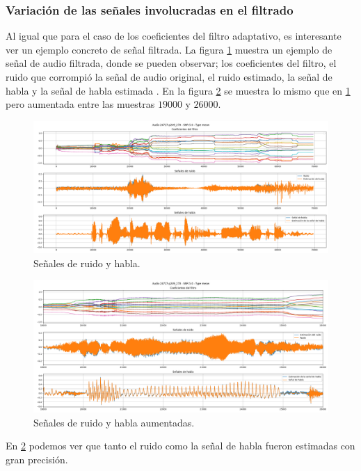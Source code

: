 \subsubsection{Variación de las señales involucradas en el filtrado}

Al igual que para el caso de los coeficientes del filtro adaptativo, es interesante ver un ejemplo concreto de señal filtrada. La figura \ref{fig:ch6_señal_ruido_habla} muestra un ejemplo de señal de audio filtrada, donde se pueden observar; los coeficientes del filtro, el ruido que corrompió la señal de audio original, el ruido estimado, la señal de habla y la señal de habla estimada . En la figura \ref{fig:ch6_señal_ruido_habla_aumentada} se muestra lo mismo que en \ref{fig:ch6_señal_ruido_habla} pero aumentada entre las muestras $19000$ y $26000$.

\begin{figure}
	\centering
	\centerline{\includegraphics[scale=0.35]{images/ch6/af/signals/signals.png}}
	\caption{Señales de ruido y habla.}
	\label{fig:ch6_señal_ruido_habla}
\end{figure}


\begin{figure}
	\centering
	\centerline{\includegraphics[scale=0.35]{images/ch6/af/signals/zoomed_signals.png}}
	\caption{Señales de ruido y habla aumentadas.}
	\label{fig:ch6_señal_ruido_habla_aumentada}
\end{figure}

En \ref{fig:ch6_señal_ruido_habla_aumentada} podemos ver que tanto el ruido como la señal de habla fueron estimadas con gran precisión.